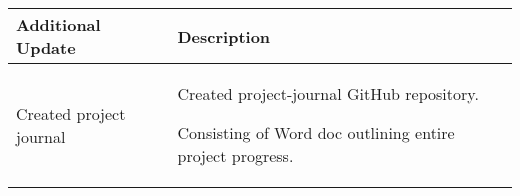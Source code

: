 \begin{table}[!h]
    \centering
    \begin{tabularx}{\textwidth}{|l|X|}
        \hline
        Additional Update & Description \\
        \hline
        \hline
        Created project journal & 
        \begin{myitemize}
            \item Created project-journal GitHub repository.
            \item Consisting of Word doc outlining entire project progress.
        \end{myitemize} \\
        \hline
    \end{tabularx}
\end{table}
